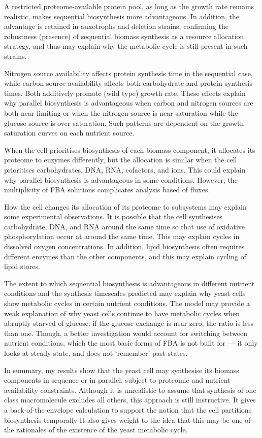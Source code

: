 A restricted proteome-available protein pool, as long as the growth rate remains realistic, makes sequential biosynthesis more advantageous.
In addition, the advantage is retained in auxotrophs and deletion strains, confirming the robustness (presence) of sequential biomass synthesis as a resource allocation strategy, and thus may explain why the metabolic cycle is still present in such strains.

Nitrogen source availability affects protein synthesis time in the sequential case, while carbon source availability affects both carbohydrate and protein synthesis times.
Both additively promote (wild type) growth rate.
These effects explain why parallel biosynthesis is advantageous when carbon and nitrogen sources are both near-limiting or when the nitrogen source is near saturation while the glucose source is over saturation.
Such patterns are dependent on the growth saturation curves on each nutrient source.

When the cell prioritises biosynthesis of each biomass component, it allocates its proteome to enzymes differently, but the allocation is similar when the cell prioritises carbohydrates, DNA, RNA, cofactors, and ions.
This could explain why parallel biosynthesis is advantageous in some conditions.
However, the multiplicity of FBA solutions complicates analysis based of fluxes.

How the cell changes its allocation of its proteome to subsystems may explain some experimental observations.
It is possible that the cell synthesises carbohydrate, DNA, and RNA around the same time so that use of  oxidative phosphorylation occur at around the same time.
This may explain cycles in dissolved oxygen concentrations.
In addition, lipid biosynthesis often requires different enzymes than the other components, and this may explain cycling of lipid stores.

The extent to which sequential biosynthesis is advantageous in different nutrient conditions and the synthesis timescales predicted may explain why yeast cells show metabolic cycles in certain nutrient conditions.
The model may provide a weak explanation of why yeast cells continue to have metabolic cycles when abruptly starved of glucose: if the glucose exchange is near zero, the ratio is less than one.
Though, a better investigation would account for switching between nutrient conditions, which the most basic forms of FBA is not built for --- it only looks at steady state, and does not `remember' past states.

In summary, my results show that the yeast cell may synthesise its biomass components in sequence or in parallel, subject to proteomic and nutrient availability constraints.
Although it is unrealistic to assume that synthesis of one class macromolecule excludes all others, this approach is still instructive.
It gives a back-of-the-envelope calculation to support the notion that the cell partitions biosynthesis temporally
It also gives weight to the idea that this may be one of the rationales of the existence of the yeast metabolic cycle.

